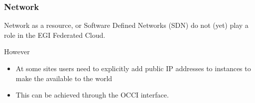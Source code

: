 \begin{frame}
\frametitle{Network}
Network as a resource, or Software Defined Networks (SDN) do not (yet) play a role in the EGI Federated Cloud.

\vspace{1em}
However
\begin{itemize}
\item At some sites users need to explicitly add public IP addresses
  to instances to make the available to the world
\item This can be achieved through the OCCI interface.
\end{itemize}
\end{frame}


